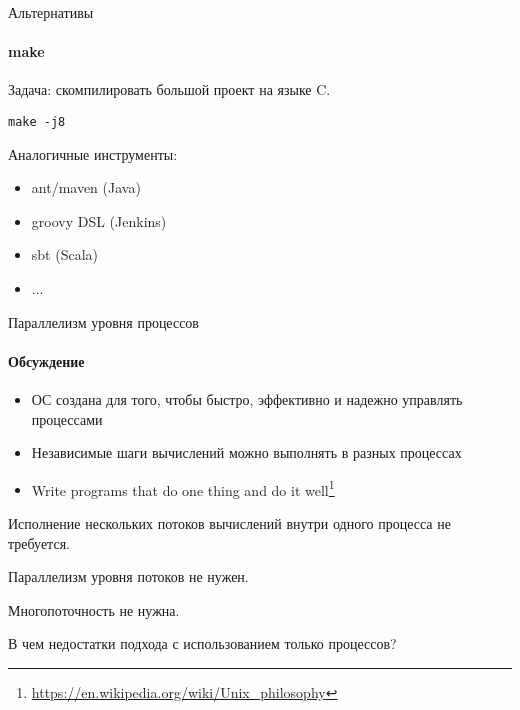 \begin{frame}[fragile]{Альтернативы}
\framesubtitle{make}

Задача: скомпилировать большой проект на языке C.

\begin{lstlisting}
make -j8
\end{lstlisting}

Аналогичные инструменты: 
\begin{itemize}
    \item ant/maven (Java)
    \item groovy DSL (Jenkins)
    \item sbt (Scala)
    \item ...
\end{itemize}

\end{frame}

\begin{frame}{Параллелизм уровня процессов}
\framesubtitle{Обсуждение}

\begin{itemize}
 \item ОС создана для того, чтобы быстро, эффективно и надежно управлять процессами
 \item Независимые шаги вычислений можно выполнять в разных процессах
 \item Write programs that do one thing and do it well\footnote{\url{https://en.wikipedia.org/wiki/Unix_philosophy}}
\end{itemize}

\pause
Исполнение нескольких потоков вычислений внутри одного процесса не требуется.

\pause 
Параллелизм уровня потоков не нужен.

\pause
Многопоточность не нужна.

\pause
В чем недостатки подхода с использованием только процессов?

\end{frame}



